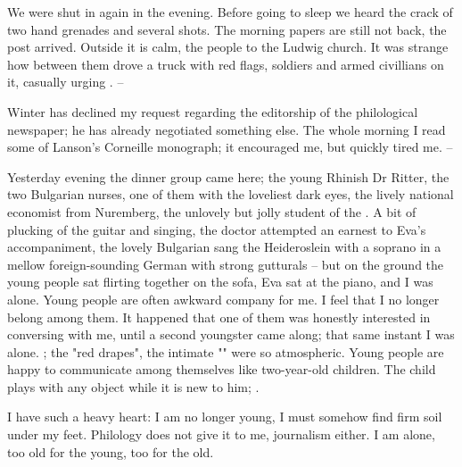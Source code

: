 
We were shut in again in the evening. Before going to sleep we heard the crack of two hand grenades and several shots. The morning papers are still not back, the post arrived. Outside it is calm, the people  to the Ludwig church. It was strange how between them drove a truck with red flags, soldiers and armed civillians on it, casually urging . --

Winter has declined my request regarding the editorship of the philological newspaper; he has already negotiated something else. The whole morning I read some of Lanson's Corneille monograph; it encouraged me, but quickly tired me. --

Yesterday evening the dinner group came here; the young Rhinish Dr Ritter, the two Bulgarian nurses, one of them  with the loveliest dark eyes, the lively national economist from Nuremberg, the unlovely but jolly student of the . A bit of plucking of the guitar and singing, the doctor attempted an earnest  to Eva's accompaniment, the lovely Bulgarian sang the Heideroslein with a  soprano in a mellow foreign-sounding German with strong gutturals -- but on the ground the young people sat flirting together on the sofa, Eva sat at the piano, and I was alone. Young people are often awkward company for me. I feel that I no longer belong among them. It happened that one of them was honestly interested in conversing with me, until a second youngster came along; that same instant I was alone. ; the "red drapes", the intimate "" were so atmospheric. Young people are happy to communicate among themselves like two-year-old children. The child plays with any object while it is new to him; .

I have such a heavy heart: I am no longer young, I must somehow find firm soil under my feet. Philology does not give it to me, journalism either. I am alone, too old for the young, too  for the old.

% 